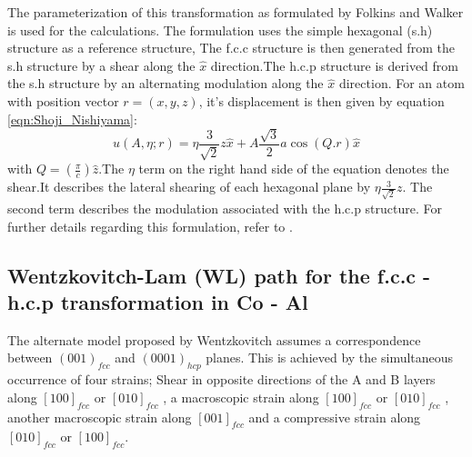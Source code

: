 \documentclass[preprint]{elsarticle}
\begin{document}
The parameterization of this transformation as formulated by Folkins and Walker  is used for the calculations. The formulation uses the simple hexagonal (s.h) structure as a 
reference structure, The f.c.c structure is then generated from the s.h structure by a shear along the $\hat{x}$ direction.The h.c.p structure is derived from the s.h structure by 
an alternating modulation along the $\hat{x}$ direction. For an atom with position vector 
$r=(x,y,z)$, it's displacement is then given by equation \ref{eqn:Shoji_Nishiyama}:
\begin{equation}
 u(A,\eta;r)=\eta \frac{3}{\sqrt{2}}z \hat{x} + A\frac{\sqrt{3}}{2} a\cos(Q.r)\hat{x}
\label{eqn:Shoji_Nishiyama}
\end{equation}
 with $Q=(\frac{\pi}{c})\hat{z}$.The $\eta$ term on the right hand side of the equation denotes the shear.It describes the lateral shearing of each hexagonal plane by $\eta \frac{3}{\sqrt{2}}z$.
The second term describes the modulation associated with the h.c.p structure. For further details regarding this formulation, refer to \cite{folkins1990configuration}.

\subsection{Wentzkovitch-Lam (WL) path for the f.c.c - h.c.p transformation in Co - Al}

The alternate model proposed by Wentzkovitch\cite{wentzcovitch1991fcc} assumes a correspondence between  $ (0 0 1)_{fcc}$ and  $ (0 0 0 1)_{hcp}$ planes. This is achieved by the simultaneous 
occurrence of four strains\cite{wentzcovitch1991fcc}; Shear in opposite directions of the A and B layers along $[1 0 0]_{fcc}$ or  $[0 1 0]_{fcc}$ , a macroscopic strain along 
$[1 0 0]_{fcc}$ or  $[0 1 0]_{fcc}$ , another macroscopic strain along $[0 0 1]_{fcc}$ and a compressive strain along $[0 1 0]_{fcc}$ or $[1 0 0]_{fcc}$.
\end{document}
